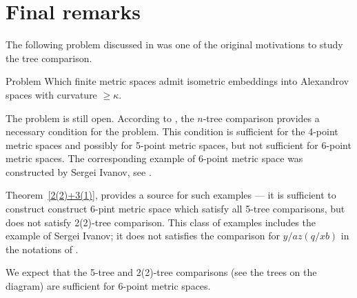 \section{Final remarks}

The following problem discussed in \cite[7.1]{AKP} was one of the original motivations to study the tree comparison.

\begin{thm}{Problem}
Which finite metric spaces admit isometric embeddings into Alexandrov spaces with curvature $\ge \kappa$.
\end{thm}

The problem is still open.
According to \cite[4.1]{AKP}, the $n$-tree comparison provides a necessary condition for the problem.
This condition is sufficient for the 4-point metric spaces and possibly for 5-point metric spaces, but not sufficient for 6-point metric spaces.
The corresponding example of 6-point metric space was constructed by Sergei Ivanov, see \cite{AKP}.

Theorem~\ref{2(2)+3(1)}, provides a source for such examples --- it is sufficient to construct construct 6-pint metric space which satisfy all 5-tree comparisons, but does not satisfy 2(2)-tree comparison.
This class of examples includes the example of Sergei Ivanov;
it does not satisfies the comparison for $y/az(q/xb)$ in the notations of \cite[7.1]{AKP}.

We expect that the 5-tree and 2(2)-tree comparisons (see the trees on the diagram) are sufficient for 6-point metric spaces. 
\hide
\begin{center}
\hskip10mm
\end{center}
\unhide